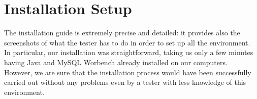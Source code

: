 \chapter{Installation Setup}

The installation guide is extremely precise and detailed: it provides also the screenshots of what the tester has to do in order to set up all the environment.  \\In particular, our installation was straightforward, taking us only a few minutes having Java and MySQL Worbench already installed on our computers. \\
However, we are sure that the installation process would have been successfully carried out without any problems even by a tester with less knowledge of this environment.
 